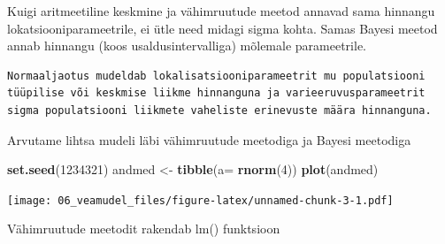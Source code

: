 \documentclass[]{book}
\newenvironment{Shaded}{\begin{snugshade}}{\end{snugshade}}
\newcommand{\KeywordTok}[1]{\textcolor[rgb]{0.13,0.29,0.53}{\textbf{#1}}}
\newcommand{\DataTypeTok}[1]{\textcolor[rgb]{0.13,0.29,0.53}{#1}}
\newcommand{\DecValTok}[1]{\textcolor[rgb]{0.00,0.00,0.81}{#1}}
\newcommand{\StringTok}[1]{\textcolor[rgb]{0.31,0.60,0.02}{#1}}
\newcommand{\CommentTok}[1]{\textcolor[rgb]{0.56,0.35,0.01}{\textit{#1}}}
\newcommand{\OperatorTok}[1]{\textcolor[rgb]{0.81,0.36,0.00}{\textbf{#1}}}
\newcommand{\NormalTok}[1]{#1}
\begin{document}
Kuigi aritmeetiline keskmine ja vähimruutude meetod annavad sama
hinnangu lokatsiooniparameetrile, ei ütle need midagi sigma kohta. Samas
Bayesi meetod annab hinnangu (koos usaldusintervalliga) mõlemale
parameetrile.

\begin{verbatim}
Normaaljaotus mudeldab lokalisatsiooniparameetrit mu populatsiooni 
tüüpilise või keskmise liikme hinnanguna ja varieeruvusparameetrit 
sigma populatsiooni liikmete vaheliste erinevuste määra hinnanguna. 
\end{verbatim}

Arvutame lihtsa mudeli läbi vähimruutude meetodiga ja Bayesi meetodiga

\begin{Shaded}
\begin{Highlighting}[]
\KeywordTok{set.seed}\NormalTok{(}\DecValTok{1234321}\NormalTok{)}
\NormalTok{andmed <-}\StringTok{ }\KeywordTok{tibble}\NormalTok{(}\DataTypeTok{a=} \KeywordTok{rnorm}\NormalTok{(}\DecValTok{4}\NormalTok{))}
\KeywordTok{plot}\NormalTok{(andmed)}
\end{Highlighting}
\end{Shaded}

\texttt{[image: 06\_veamudel\_files/figure-latex/unnamed-chunk-3-1.pdf]}

\begin{Shaded}
\end{Shaded}

Vähimruutude meetodit rakendab lm() funktsioon

\begin{Shaded}
\end{Shaded}
\end{document}
